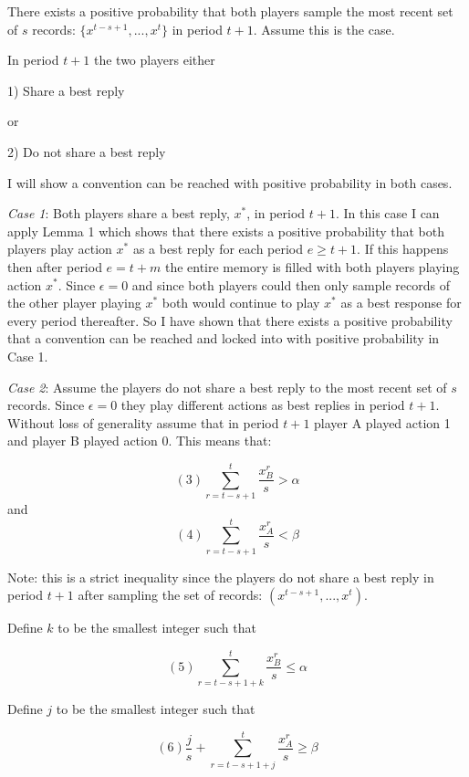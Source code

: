 \documentclass{article}
\begin{document}
\vskip12pt

There exists a positive probability that both players sample the most recent set of $s$ records: $\{x^{t-s+1},...,x^{t}\}$ in period $t+1$. Assume this is the case.

\vskip12pt

In period $t+1$ the two players either

1) Share a best reply

or 

2) Do not share a best reply

I will show a convention can be reached with positive probability in both cases.

\textit{Case 1}: Both players share a best reply, $x^*$, in period $t+1$. In this case I can apply Lemma 1 which shows that there exists a positive probability that both players play action $x^*$ as a best reply for each period $e \geq t+1$. If this happens then after period $e=t+m$ the entire memory is filled with both players playing action $x^*$. Since $\epsilon=0$ and since both players could then only sample records of the other player playing $x^*$ both would continue to play $x^*$ as a best response for every period thereafter. So I have shown that there exists a positive probability that a convention can be reached and locked into with positive probability in Case 1. 

\vskip24pt

\textit{Case 2}: Assume the players do not share a best reply to the most recent set of $s$ records. Since $\epsilon=0$ they play different actions as best replies in period $t+1$. Without loss of generality assume that in period $t+1$ player A played action 1 and player B played action 0. This means that:

$$(3) \sum\limits_{r=t-s+1}^{t} \frac{x^r_B}{s} > \alpha$$
and
$$(4) \sum\limits_{r=t-s+1}^{t} \frac{x^r_A}{s} < \beta$$

Note: this is a strict inequality since the players do not share a best reply in period $t+1$ after sampling the set of records: $(x^{t-s+1},...,x^{t})$.

\vskip12pt

Define $k$ to be the smallest integer such that

$$(5) \sum\limits_{r=t-s+1+k}^{t} \frac{x^r_B}{s} \leq \alpha$$

Define $j$ to be the smallest integer such that

$$(6) \frac{j}{s}+\sum\limits_{r=t-s+1+j}^{t} \frac{x^r_A}{s} \geq \beta$$
\end{document}
